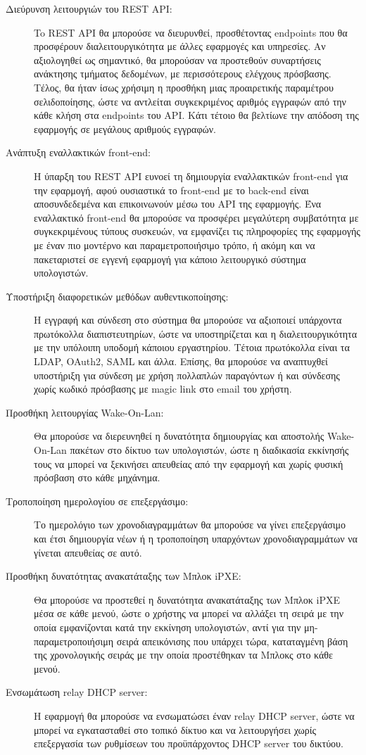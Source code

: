 \begin{description}
	\item[Διεύρυνση λειτουργιών του REST API:] To REST API θα μπορούσε να διευρυνθεί, προσθέτοντας endpoints που θα προσφέρουν διαλειτουργικότητα με άλλες εφαρμογές και υπηρεσίες. Αν αξιολογηθεί ως σημαντικό, θα μπορούσαν να προστεθούν συναρτήσεις ανάκτησης τμήματος δεδομένων, με περισσότερους ελέγχους πρόσβασης. Τέλος, θα ήταν ίσως χρήσιμη η προσθήκη μιας προαιρετικής παραμέτρου σελιδοποίησης, ώστε να αντλείται συγκεκριμένος αριθμός εγγραφών από την κάθε κλήση στα endpoints του API. Κάτι τέτοιο θα βελτίωνε την απόδοση της εφαρμογής σε μεγάλους αριθμούς εγγραφών.
	\item[Ανάπτυξη εναλλακτικών front-end:] Η ύπαρξη του REST API ευνοεί τη δημιουργία εναλλακτικών front-end για την εφαρμογή, αφού ουσιαστικά το front-end με το back-end είναι αποσυνδεδεμένα και επικοινωνούν μέσω του API της εφαρμογής. Ένα εναλλακτικό front-end θα μπορούσε να προσφέρει μεγαλύτερη συμβατότητα με συγκεκριμένους τύπους συσκευών, να εμφανίζει τις πληροφορίες της εφαρμογής με έναν πιο μοντέρνο και παραμετροποιήσιμο τρόπο, ή ακόμη και να πακεταριστεί σε εγγενή εφαρμογή για κάποιο λειτουργικό σύστημα υπολογιστών.
	\item[Υποστήριξη διαφορετικών μεθόδων αυθεντικοποίησης:] Η εγγραφή και σύνδεση στο σύστημα θα μπορούσε να αξιοποιεί υπάρχοντα πρωτόκολλα διαπιστευτηρίων, ώστε να υποστηρίζεται και η διαλειτουργικότητα με την υπόλοιπη υποδομή κάποιου εργαστηρίου. Τέτοια πρωτόκολλα είναι τα LDAP, OAuth2, SAML και άλλα. Επίσης, θα μπορούσε να αναπτυχθεί υποστήριξη για σύνδεση με χρήση πολλαπλών παραγόντων ή και σύνδεσης χωρίς κωδικό πρόσβασης με magic link στο email του χρήστη.
	\item[Προσθήκη λειτουργίας Wake-On-Lan:] Θα μπορούσε να διερευνηθεί η δυνατότητα δημιουργίας και αποστολής Wake-On-Lan πακέτων στο δίκτυο των υπολογιστών, ώστε η διαδικασία εκκίνησής τους να μπορεί να ξεκινήσει απευθείας από την εφαρμογή και χωρίς φυσική πρόσβαση στο κάθε μηχάνημα.
	\item[Τροποποίηση ημερολογίου σε επεξεργάσιμο:] Το ημερολόγιο των χρονοδιαγραμμάτων θα μπορούσε να γίνει επεξεργάσιμο και έτσι δημιουργία νέων  ή η τροποποίηση υπαρχόντων χρονοδιαγραμμάτων να γίνεται απευθείας σε αυτό.
	\item[Προσθήκη δυνατότητας ανακατάταξης των Μπλοκ iPXE:] Θα μπορούσε να προστεθεί η δυνατότητα ανακατάταξης των Μπλοκ iPXE μέσα σε κάθε μενού, ώστε ο χρήστης να μπορεί να αλλάξει τη σειρά με την οποία εμφανίζονται κατά την εκκίνηση υπολογιστών, αντί για την μη-παραμετροποιήσιμη σειρά απεικόνισης που υπάρχει τώρα, καταταγμένη βάση της χρονολογικής σειράς με την οποία προστέθηκαν τα Μπλοκς στο κάθε μενού.
	\item[Ενσωμάτωση relay DHCP server:] Η εφαρμογή θα μπορούσε να ενσωματώσει έναν relay DHCP server, ώστε να μπορεί να εγκατασταθεί στο τοπικό δίκτυο και να λειτουργήσει χωρίς επεξεργασία των ρυθμίσεων του προϋπάρχοντος DHCP server του δικτύου.
\end{description}

